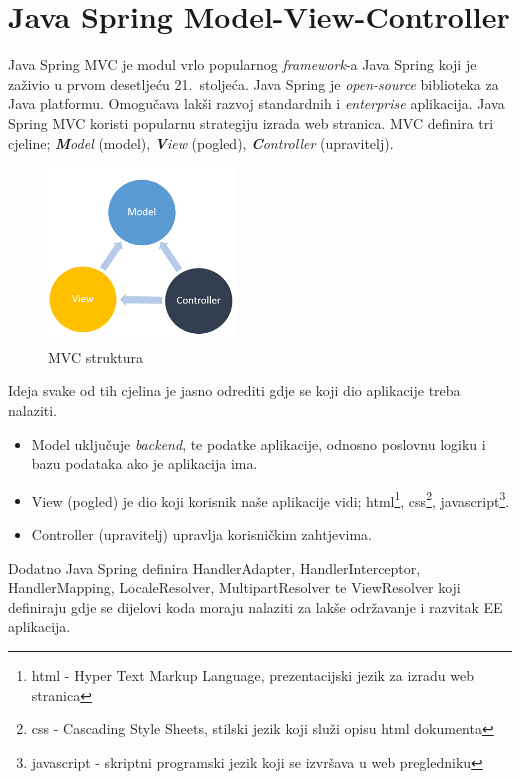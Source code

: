 \documentclass[times, utf8, zavrsni, numeric]{fer}
\begin{document}
\section{Java Spring Model-View-Controller}
\qquad Java Spring MVC je modul vrlo popularnog \textit{framework}-a\footnotemark{} Java Spring koji je zaživio u prvom desetljeću 21.~stoljeća.
Java Spring je \textit{open-source}\footnotemark{} biblioteka za Java platformu.
Omogučava lakši razvoj standardnih i \textit{enterprise}\footnotemark{} aplikacija.
Java Spring MVC koristi popularnu strategiju izrada web stranica.
MVC definira tri cjeline; \textit{\textbf{M}odel} (model), \textit{\textbf{V}iew} (pogled), \textit{\textbf{C}ontroller} (upravitelj).
\begin{figure}[htb]
				\centering
				\includegraphics[width=5cm]{images/mvc.png}
				\caption{MVC struktura}
				\label{fig:mvc}
\end{figure}

\noindent
Ideja svake od tih cjelina je jasno odrediti gdje se koji dio aplikacije treba nalaziti.
\begin{itemize}
				\item Model uključuje \textit{backend}\footnotemark{}, te podatke aplikacije, odnosno poslovnu logiku i bazu podataka ako je aplikacija ima.
	\item View (pogled) je dio koji korisnik naše aplikacije vidi; 
		html\footnote{html - Hyper Text Markup Language, prezentacijski jezik za izradu web stranica}, 
		css\footnote{css - Cascading Style Sheets, stilski jezik koji služi opisu html dokumenta}, 
		javascript\footnote{javascript - skriptni programski jezik koji se izvršava u web pregledniku}.
	\item Controller (upravitelj) upravlja korisničkim zahtjevima.
\end{itemize}
Dodatno Java Spring definira HandlerAdapter, HandlerInterceptor, HandlerMapping, LocaleResolver, MultipartResolver te ViewResolver koji definiraju gdje se dijelovi koda moraju nalaziti za lakše održavanje i razvitak EE\footnotemark{} aplikacija.
\end{document}

